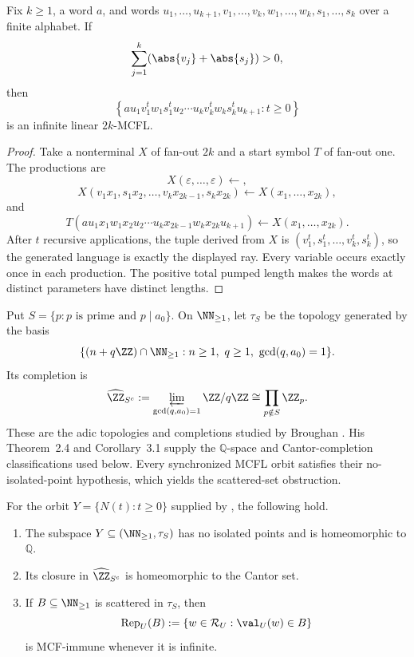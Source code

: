 \begin{lemma}
  \label{lem:synchronized-ray-linear-mcfg}
  Fix \(k\ge1\), a word \(a\), and words
  \(u_1,\ldots,u_{k+1},v_1,\ldots,v_k,w_1,\ldots,w_k,
  s_1,\ldots,s_k\) over a finite alphabet. If
  \[
    \sum_{j=1}^k(\abs{v_j}+\abs{s_j})>0,
  \]
  then
  \[
    \left\{a u_1v_1^tw_1s_1^tu_2\cdots
      u_kv_k^tw_ks_k^tu_{k+1}:t\ge0\right\}
  \]
  is an infinite linear \(2k\)-MCFL.
\end{lemma}

\begin{proof}
  Take a nonterminal \(X\) of fan-out \(2k\) and a start symbol \(T\) of
  fan-out one. The productions are
  \[
    X(\varepsilon,\ldots,\varepsilon)\leftarrow,
  \]
  \[
    X(v_1x_1,s_1x_2,\ldots,v_kx_{2k-1},s_kx_{2k})
      \leftarrow X(x_1,\ldots,x_{2k}),
  \]
  and
  \[
    T(a u_1x_1w_1x_2u_2\cdots
      u_kx_{2k-1}w_kx_{2k}u_{k+1})
      \leftarrow X(x_1,\ldots,x_{2k}).
  \]
  After \(t\) recursive applications, the tuple derived from \(X\) is
  \((v_1^t,s_1^t,\ldots,v_k^t,s_k^t)\), so the generated language is
  exactly the displayed ray. Every variable occurs exactly once in each
  production. The positive total pumped length makes the words at
  distinct parameters have distinct lengths.
\end{proof}

Put \(S=\{p:p\text{ is prime and }p\mid a_0\}\). On
\(\NN_{\ge1}\), let \(\tau_S\) be the topology generated by the basis
\[
  \{(n+q\ZZ)\cap\NN_{\ge1}:n\ge1,\ q\ge1,\ \gcd(q,a_0)=1\}.
\]
Its completion is
\[
  \widehat{\ZZ}_{S^c}
    :=\varprojlim_{\gcd(q,a_0)=1}\ZZ/q\ZZ
    \cong\prod_{p\notin S}\ZZ_p.
\]
These are the adic topologies and completions studied by Broughan
\cite{Broughan2003}. His Theorem~2.4 and Corollary~3.1 supply the
\(\mathbb Q\)-space and Cantor-completion classifications used below.
Every synchronized MCFL orbit satisfies their no-isolated-point hypothesis,
which yields the scattered-set obstruction.

\begin{theorem}
  \label{thm:mcfl-local-adic-fingerprint}
  For the orbit \(Y=\{N(t):t\ge0\}\) supplied by
  , the following hold.
  \begin{enumerate}[label=\textup{(\roman*)}]
    \item The subspace \(Y\subseteq(\NN_{\ge1},\tau_S)\) has no isolated
    points and is homeomorphic to \(\mathbb Q\).
    \item Its closure in \(\widehat{\ZZ}_{S^c}\) is homeomorphic to the
    Cantor set.
    \item If \(B\subseteq\NN_{\ge1}\) is scattered in \(\tau_S\), then
    \[
      \operatorname{Rep}_U(B)
        :=\{w\in\mathcal R_U:\val_U(w)\in B\}
    \]
    is MCF-immune whenever it is infinite.
  \end{enumerate}
\end{theorem}

